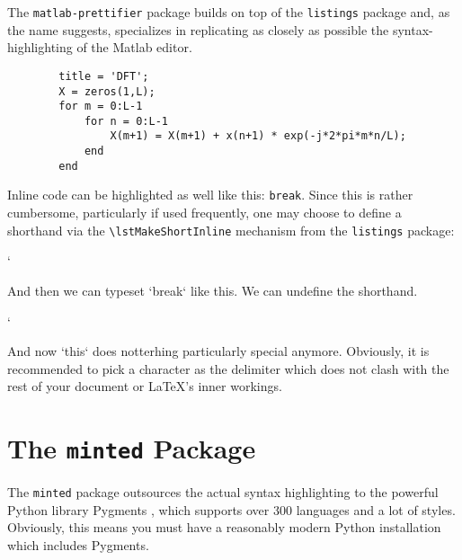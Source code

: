 \documentclass[article,a4paper,oneside,10pt]{memoir}
\newcommand\code[1]{\texttt{#1}}
\begin{document}
The  \code{matlab-prettifier} package  builds  on top  of the  \code{listings}
package and,  as the name suggests,  specializes in replicating as  closely as
possible the syntax-highlighting of the Matlab editor.

\begin{tcblisting}{}
    
\end{tcblisting}

\begin{tcblisting}{}
    \begin{lstlisting}[gobble=8,style=Matlab-bw]
        % Discrete Fourier Transform of said signal
        title = 'DFT';
        X = zeros(1,L);
        for m = 0:L-1
            for n = 0:L-1
                X(m+1) = X(m+1) + x(n+1) * exp(-j*2*pi*m*n/L);
            end
        end
    \end{lstlisting}
\end{tcblisting}

\begin{tcblisting}{}
    Inline    code    can    be     highlighted    as    well    like    this:
    \lstinline[style=Matlab-pyglike]!break!.  Since this is rather cumbersome,
    particularly if used frequently, one may  choose to define a shorthand via
    the \verb|\lstMakeShortInline| mechanism from the \verb|listings| package:

    \lstMakeShortInline[style=Matlab-pyglike]`

    And then we can typeset `break` like this. We can undefine the shorthand.

    \lstDeleteShortInline`

    And now `this`  does notterhing particularly special  anymore.  Obviously, it
    is recommended to  pick a character as the delimiter  which does not clash
    with the rest of your document or \LaTeX's inner workings.

\end{tcblisting}


\chapter{The \code{minted} Package \cite{minted}}
\label{chap:minted}

The \code{minted}  package outsources  the actual  syntax highlighting  to the
powerful  Python library  Pygments  \cite{pygments}, which  supports over  300
languages  and  a  lot  of  styles. Obviously, this  means  you  must  have  a
reasonably modern Python installation which includes Pygments.
\end{document}
